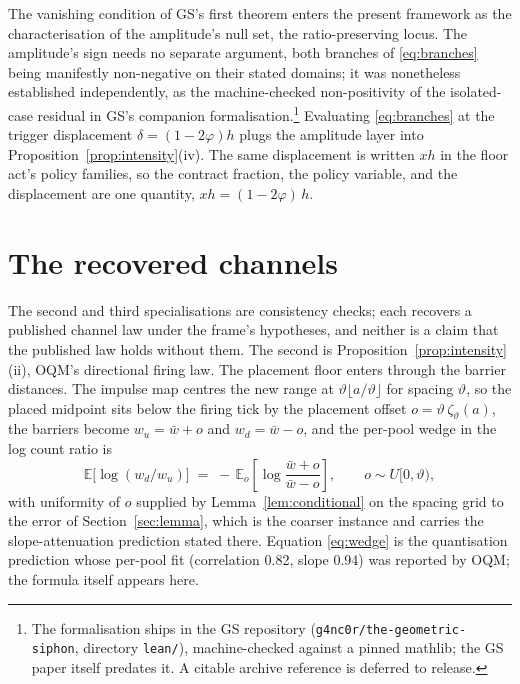 \documentclass[11pt,a4paper]{article}
\theoremstyle{definition}
\theoremstyle{plain}
\theoremstyle{remark}
\begin{document}
The vanishing condition of GS's first theorem enters the present framework as the characterisation of the amplitude's null set, the ratio-preserving locus. 
The amplitude's sign needs no separate argument, both branches of \eqref{eq:branches} being manifestly non-negative on their stated domains; it was nonetheless established 
independently, as the machine-checked non-positivity of the isolated-case residual in GS's companion formalisation.\footnote{The formalisation ships in the GS 
repository (\texttt{g4nc0r/the-geometric-siphon}, directory \texttt{lean/}), machine-checked against a pinned mathlib; the GS paper itself predates it. A citable 
archive reference is deferred to release.} Evaluating \eqref{eq:branches} at the trigger displacement $\delta = (1 - 2\varphi) h$ plugs the amplitude layer into 
Proposition~\ref{prop:intensity}(iv). The same displacement is written $xh$ in the floor act's policy families, so the contract fraction, the policy variable, and the 
displacement are one quantity, $xh = (1 - 2\varphi)\,h$.

\section{The recovered channels}\label{sec:red-frequency}\label{sec:red-value}

The second and third specialisations are consistency checks; each recovers a published channel law under the frame's hypotheses, and neither is a claim that the published 
law holds without them. The second is Proposition~\ref{prop:intensity}(ii), OQM's directional firing law. The placement floor enters through the barrier distances. The impulse 
map centres the new range at $\vartheta \lfloor a / \vartheta \rfloor$ for spacing $\vartheta$, so the placed midpoint sits below the firing tick by the placement 
offset $o =
\vartheta\, \zeta_\vartheta(a)$, the barriers become $w_u = \bar w + o$ and $w_d = \bar w - o$, and the per-pool wedge in the log count ratio is
\begin{equation}\label{eq:wedge}
\mathbb{E}\big[\log(w_d / w_u)\big] \;=\; -\,\mathbb{E}_o\left[
\log \frac{\bar w + o}{\bar w - o} \right],
\qquad o \sim U[0, \vartheta),
\end{equation}
with uniformity of $o$ supplied by Lemma~\ref{lem:conditional} on the spacing grid to the error of Section~\ref{sec:lemma}, which is the coarser instance and carries 
the slope-attenuation prediction stated there. Equation \eqref{eq:wedge} is the quantisation prediction whose per-pool fit (correlation 0.82, slope 0.94) was reported by OQM; 
the formula itself appears here.
\end{document}
